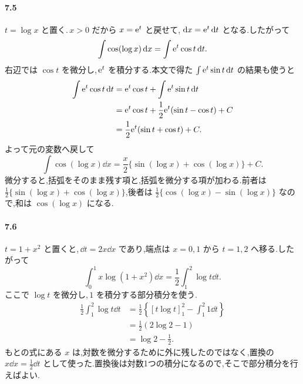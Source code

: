 \paragraph{7.5}
$t=\log x$ と置く.\,$x>0$ だから $x=\mathrm{e}^t$ と戻せて,\,$\,\mathrm{d} x=\mathrm{e}^t\,\mathrm{d} t$ となる.したがって
\[
 \int\cos(\log x)\,\mathrm{d} x
 =\int\mathrm{e}^t\cos t\,\mathrm{d} t.
\]
右辺では $\cos t$ を微分し,\,$\mathrm{e}^t$ を積分する.本文で得た $\int\mathrm{e}^t\sin t\,\mathrm{d} t$ の結果も使うと
\[
\begin{aligned}
 \int\mathrm{e}^t\cos t\,\mathrm{d} t
 &=\mathrm{e}^t\cos t+\int\mathrm{e}^t\sin t\,\mathrm{d} t\\
 &=\mathrm{e}^t\cos t+\frac12\mathrm{e}^t(\sin t-\cos t)+C\\
 &=\frac12\mathrm{e}^t(\sin t+\cos t)+C.
\end{aligned}
\]
よって元の変数へ戻して
\[
 \int\cos(\log x)\dd x
 =\frac x2\{\sin(\log x)+\cos(\log x)\}+C.
\]
微分すると,括弧をそのまま残す項と,括弧を微分する項が加わる.前者は $\frac12\{\sin(\log x)+\cos(\log x)\}$,後者は $\frac12\{\cos(\log x)-\sin(\log x)\}$ なので,和は $\cos(\log x)$ になる.

\paragraph{7.6}
$t=1+x^2$ と置くと,\,$\dd t=2x\dd x$ であり,端点は $x=0,1$ から $t=1,2$ へ移る.したがって
\[
 \int_0^1x\log(1+x^2)\dd x
 =\frac12\int_1^2\log t\dd t.
\]
ここで $\log t$ を微分し,\,$1$ を積分する部分積分を使う.
\[
\begin{aligned}
 \frac12\int_1^2\log t\dd t
 &=\frac12\left\{[t\log t]_1^2-\int_1^2 1\dd t\right\}\\
 &=\frac12(2\log2-1)\\
 &=\log2-\frac12.
\end{aligned}
\]
もとの式にある $x$ は,対数を微分するために外に残したのではなく,置換の $x\dd x=\frac12\dd t$ として使った.置換後は対数1つの積分になるので,そこで部分積分を行えばよい.


